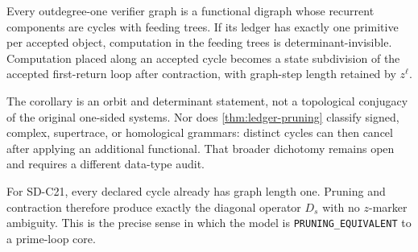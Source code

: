 \begin{corollary}
\label{cor:functional}
Every outdegree-one verifier graph is a functional digraph whose recurrent
components are cycles with feeding trees.  If its ledger has exactly one
primitive per accepted object, computation in the feeding trees is
determinant-invisible.  Computation placed along an accepted cycle becomes a
state subdivision of the accepted first-return loop after contraction, with
graph-step length retained by $z^\ell$.
\end{corollary}

The corollary is an orbit and determinant statement, not a topological
conjugacy of the original one-sided systems.  Nor does
\cref{thm:ledger-pruning} classify signed, complex, supertrace, or homological
grammars: distinct cycles can then cancel after applying an additional
functional.  That broader dichotomy remains open and requires a different
data-type audit.

For SD-C21, every declared cycle already has graph length one.  Pruning and
contraction therefore produce exactly the diagonal operator $D_s$ with no
$z$-marker ambiguity.  This is the precise sense in which the model is
\texttt{PRUNING\_EQUIVALENT} to a prime-loop core.
